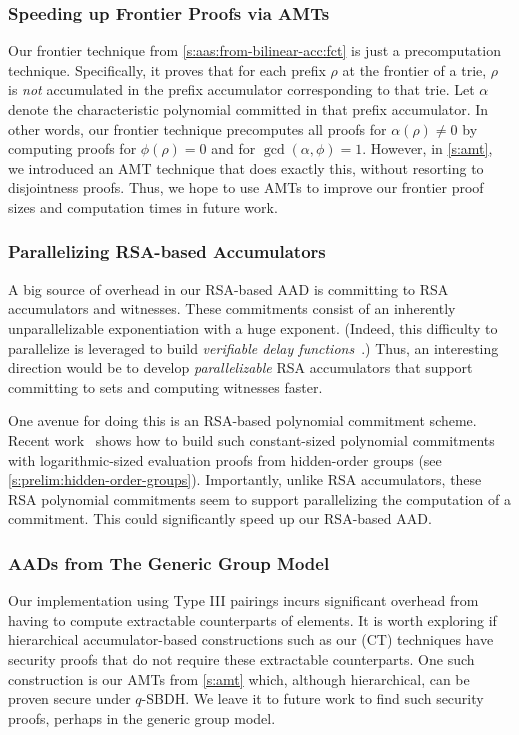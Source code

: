 \subsubsection{Speeding up Frontier Proofs via AMTs}
\label{s:future-work:aads:current:amt-frontiers}
Our frontier technique from \cref{s:aas:from-bilinear-acc:fct} is just a precomputation technique.
Specifically, it proves that for each prefix $\rho$ at the frontier of a trie, $\rho$ is \textit{not} accumulated in the prefix accumulator corresponding to that trie.
Let $\alpha$ denote the characteristic polynomial committed in that prefix accumulator.
In other words, our frontier technique precomputes all proofs for $\alpha(\rho)\ne 0$ by computing proofs for $\phi(\rho)=0$ and for $\gcd(\alpha,\phi)=1$.
However, in \cref{s:amt}, we introduced an AMT technique that does exactly this, without resorting to disjointness proofs.
Thus, we hope to use AMTs to improve our frontier proof sizes and computation times in future work.

\subsubsection{Parallelizing RSA-based Accumulators}
A big source of overhead in our RSA-based AAD is committing to RSA accumulators and witnesses.
These commitments consist of an inherently unparallelizable exponentiation with a huge exponent.
(Indeed, this difficulty to parallelize is leveraged to build \textit{verifiable delay functions}~\cite{Boneh2018ASurvey,Wesolowski19,Pietrzak2018}.)
Thus, an interesting direction would be to develop \textit{parallelizable} RSA accumulators that support committing to sets and computing witnesses faster.

One avenue for doing this is an RSA-based polynomial commitment scheme.
Recent work~\cite{BFS19} shows how to build such constant-sized polynomial commitments with logarithmic-sized evaluation proofs from hidden-order groups (see \cref{s:prelim:hidden-order-groups}).
Importantly, unlike RSA accumulators, these RSA polynomial commitments seem to support parallelizing the computation of a commitment.
This could significantly speed up our RSA-based AAD.

\subsubsection{AADs from The Generic Group Model}
Our \biaad implementation using Type III pairings incurs significant overhead from having to compute extractable counterparts of elements.
It is worth exploring if hierarchical accumulator-based constructions such as our \communionTree (CT) techniques have security proofs that do not require these extractable counterparts.
One such construction is our AMTs from \cref{s:amt} which, although hierarchical, can be proven secure under $q$-SBDH.
We leave it to future work to find such security proofs, perhaps in the generic group model.

